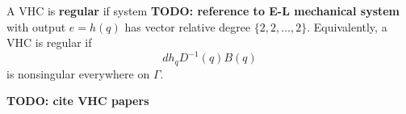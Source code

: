 \begin{defn}\label{defn:vhc_regular}
   A VHC is \textbf{regular} if system \textbf{TODO:
   reference to E-L mechanical system} with output \(e = h(q)\) has vector
   relative degree \(\{2,2,\ldots,2\}\).
   Equivalently, a VHC is regular if 
   \[
      dh_q D^{-1}(q)B(q)
   \]
   is nonsingular everywhere on \(\Gamma\).
\end{defn}
\textbf{TODO: cite VHC papers}

